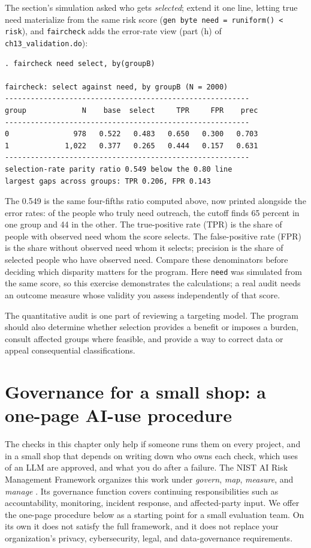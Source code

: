 The section's simulation asked who gets \emph{selected}; extend it one line, letting true need materialize from the same risk score (\texttt{gen byte need = runiform() < risk}), and \texttt{faircheck} adds the error-rate view (part (h) of \texttt{ch13\_validation.do}):
\par
{\footnotesize
\begin{verbatim}
. faircheck need select, by(groupB)

faircheck: select against need, by groupB (N = 2000)
---------------------------------------------------------
group             N    base  select     TPR     FPR    prec
---------------------------------------------------------
0               978   0.522   0.483   0.650   0.300   0.703
1             1,022   0.377   0.265   0.444   0.157   0.631
---------------------------------------------------------
selection-rate parity ratio 0.549 below the 0.80 line
largest gaps across groups: TPR 0.206, FPR 0.143
\end{verbatim}
}
The 0.549 is the same four-fifths ratio computed above, now printed alongside the error rates: of the people who truly need outreach, the cutoff finds 65 percent in one group and 44 in the other. The true-positive rate (TPR) is the share of people with observed need whom the score selects. The false-positive rate (FPR) is the share without observed need whom it selects; precision is the share of selected people who have observed need. Compare these denominators before deciding which disparity matters for the program. Here \texttt{need} was simulated from the same score, so this exercise demonstrates the calculations; a real audit needs an outcome measure whose validity you assess independently of that score.

The quantitative audit is one part of reviewing a targeting model. The program should also determine whether selection provides a benefit or imposes a burden, consult affected groups where feasible, and provide a way to correct data or appeal consequential classifications.

\section{Governance for a small shop: a one-page AI-use procedure}\label{sec:ch13-governance}
The checks in this chapter only help if someone runs them on every project, and in a small shop that depends on writing down who owns each check, which uses of an LLM are approved, and what you do after a failure. The NIST AI Risk Management Framework organizes this work under \emph{govern}, \emph{map}, \emph{measure}, and \emph{manage} \parencite{tabassi2023airmf}. Its governance function covers continuing responsibilities such as accountability, monitoring, incident response, and affected-party input. We offer the one-page procedure below as a starting point for a small evaluation team. On its own it does not satisfy the full framework, and it does not replace your organization's privacy, cybersecurity, legal, and data-governance requirements.

